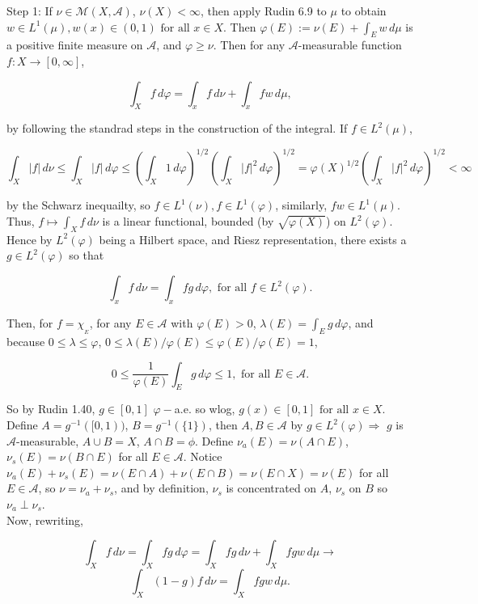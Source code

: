 \documentclass[12pt]{article}
\newcommand{\fall}[0] { \textrm{ for all } }
\newcommand{\A}[0] { \mathcal{A} }
\newcommand{\M}[0] { \mathcal{M} }
\newcommand{\rimply}[0] { \Rightarrow }
\newcommand{\rarw}[0] { \rightarrow }
\begin{document}
\noindent
Step 1: If $\nu \in \M(X, \A)$,  $\nu(X) < \infty$, then apply Rudin 6.9 to $\mu$ to obtain $w \in L^1(\mu), w(x) \in (0,1) \fall x \in X$. Then $\varphi(E) := \nu(E) + \int_E w \, d\mu$ is a positive finite measure on $\A$, and $\varphi \ge \nu$. Then for any $\A$-measurable function $f:X \rarw [0, \infty]$,

$$
\int_X f \, d\varphi = \int_x f \, d\nu + \int_x f w \, d\mu,
$$

\noindent
by following the standrad steps in the construction of the integral. If $f \in L^2(\mu)$,


$$
\int_X |f| \, d\nu  \le  \int_X |f| \, d\varphi \le \left( \int_X 1 \, d\varphi \right)^{1/2} \left( \int_X |f|^2 \, d\varphi \right)^{1/2}   = \varphi(X)^{1/2} \left( \int_X |f|^2 \, d\varphi \right)^{1/2} < \infty
$$

\noindent
by the Schwarz inequailty, so $f \in L^1(\nu), f \in L^1(\varphi)$, similarly, $fw \in L^1(\mu)$. Thus, $f \mapsto \int_X f \, d\nu$ is a linear functional, bounded (by $\sqrt{\varphi(X)}$)  on $L^2(\varphi)$. Hence by $L^2(\varphi)$ being a Hilbert space, and Riesz representation, there exists a $g \in L^2(\varphi)$ so that

$$
\int_x f \, d\nu = \int_x fg \, d\varphi, \fall f \in L^2(\varphi).
$$


\noindent
Then, for $f = \chi_{_E}$, for any $E \in \A$ with $\varphi(E) > 0$, $\lambda(E) = \int_E g \, d\varphi$, and because $ 0 \le \lambda \le \varphi$, $ 0 \le \lambda(E) / \varphi(E) \le \varphi(E)  / \varphi(E) = 1$,

$$
0 \le \frac{1}{\varphi(E)} \int_E g \, d\varphi \le 1, \fall E \in \A.
$$

\noindent
So by Rudin 1.40, $g \in [0,1]$ $\varphi-$a.e. so wlog, $g(x) \in [0,1] \fall x \in X$. \\

\noindent
Define $A = g^{-1} ([0,1))$, $B = g^{-1}( \{ 1 \})$, then $A,B \in \A$ by $g \in L^2(\varphi) \rimply$ $g$ is $\A$-measurable, $A \cup B = X$, $A \cap B = \phi$. Define $\nu_a(E) = \nu(A \cap E)$, $\nu_s(E) = \nu(B \cap E)$ for all $E \in \A$. Notice $\nu_a(E) + \nu_s(E) = \nu(E \cap A) + \nu(E \cap B) = \nu(E \cap X) = \nu(E)$ for all $E \in \A$, so $\nu = \nu_a +\nu_s$, and by definition, $\nu_s$ is concentrated on $A$, $\nu_s$ on $B$ so $\nu_a \perp \nu_s$. \\


\noindent
Now, rewriting,

$$
\int_X f \, d\nu = \int_X fg \, d\varphi =  \int_X  fg \, d\nu  +  \int_X  fgw \, d\mu \rarw 
$$
$$
 \int_X (1-g) f \, d\nu = \int_X fgw \, d\mu.
$$
\end{document}
